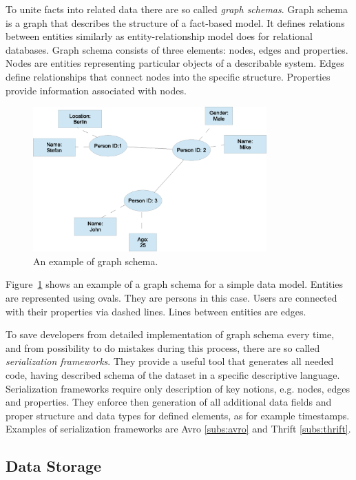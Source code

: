 To unite facts into related data there are so called \textit{graph schemas}.
Graph schema is a graph that describes the structure of a fact-based model.
It defines relations between entities similarly as entity-relationship model does for relational databases.
Graph schema consists of three elements: nodes, edges and properties.
Nodes are entities representing particular objects of a describable system.
Edges define relationships that connect nodes into the specific structure.
Properties provide information associated with nodes.

\begin{figure}[h]
  \centering
  \includegraphics [width=0.8\textwidth]{images/GraphSchema}
  \caption{An example of graph schema.}
  \label{fig:GraphSchema}
\end{figure}

Figure~\ref{fig:GraphSchema} shows an example of a graph schema for a simple data model.
Entities are represented using ovals.
They are persons in this case.
Users are connected with their properties via dashed lines.
Lines between entities are edges.

To save developers from detailed implementation of graph schema every time, and from possibility to do mistakes during this process, there are so called \textit{serialization frameworks}.
They provide a useful tool that generates all needed code, having described schema of the dataset in a specific descriptive language.
Serialization frameworks require only description of key notions, e.g. nodes, edges and properties.
They enforce then generation of all additional data fields and proper structure and data types for defined elements, as for example timestamps.  
Examples of serialization frameworks are Avro \ref{subs:avro} and Thrift \ref{subs:thrift}.

\subsection{Data Storage}

